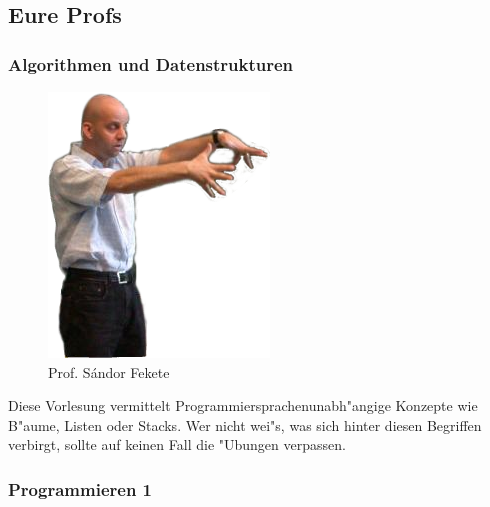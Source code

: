 \subsection{Eure Profs}

\subsubsection{Algorithmen und Datenstrukturen}

\begin{figure}[h]
	\centering\includegraphics[width=0.7\linewidth]{bilder/dozenten/fekete_frei.png}\\
	{Prof. S\'andor Fekete}
\end{figure}
Diese Vorlesung vermittelt Programmiersprachenunabh"angige Konzepte wie B"aume, Listen oder Stacks. Wer nicht wei"s, was sich hinter diesen Begriffen verbirgt, sollte auf keinen Fall die "Ubungen verpassen.


\subsubsection{Programmieren 1}


